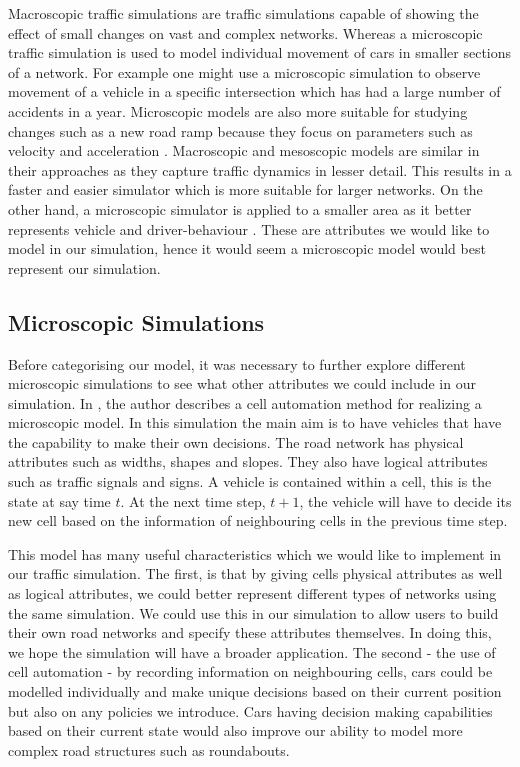 \documentclass{article}
\begin{document}
	Macroscopic traffic simulations are traffic simulations capable of showing the effect of small changes on vast and complex networks. Whereas a microscopic traffic simulation is used to model individual movement of cars  in smaller sections of a network. For example one might use a microscopic simulation to observe movement of a vehicle in a specific intersection which has had a large number of accidents in a year. Microscopic models are also more suitable for studying changes such as a new road ramp because they focus on parameters such as velocity and acceleration \cite{sokolowski2011principles}. Macroscopic and mesoscopic models are similar in their approaches as they capture traffic dynamics in lesser detail. This results in a faster and easier simulator which is more suitable for larger networks. 
	On the other hand, a microscopic simulator is applied to a smaller area as it better represents vehicle and driver-behaviour \cite{burghout2005hybrid}. These are attributes we would like to model in our simulation, hence it would seem a microscopic model would best represent our simulation. 
	
	
	\subsection{Microscopic Simulations}
	
	Before categorising our model, it was necessary to further explore different microscopic simulations to see what other attributes we could include in our simulation.
	In \cite{namekawa2005general}, the author describes a cell automation method for realizing a microscopic model. In this simulation the main aim is to have vehicles that have the capability to make their own decisions. The road network has physical attributes such as widths, shapes and slopes. They also have logical attributes such as traffic signals and signs. A vehicle is contained within a cell, this is the state at say time $t$. At the next time step, $t+1$, the vehicle will have to decide its new cell based on the information of neighbouring cells in the previous time step. 
	
	This model has many useful characteristics which we would like to implement in our traffic simulation. The first, is that by giving cells physical attributes as well as logical attributes, we could better represent different types of networks using the same simulation. We could use this in our simulation to allow users to build their own road networks and specify these attributes themselves. In doing this, we hope the simulation will have a broader application. The second - the use of cell automation - by recording information on neighbouring cells, cars could be modelled individually and make unique decisions based on their current position but also on any policies we introduce. Cars having decision making capabilities based on their current state would also improve our ability to model more complex road structures such as roundabouts.  
	
\end{document}
